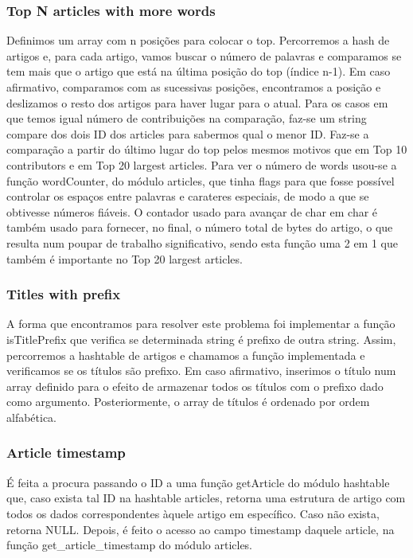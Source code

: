 \documentclass[a4paper]{article}
\begin{document}
\subsubsection{Top N articles with more words}
Definimos um array com n posições para colocar o top. Percorremos a hash de artigos e, para cada artigo, vamos buscar o número de palavras e comparamos se tem mais que o artigo que está na última posição do top (índice n-1). Em caso afirmativo, comparamos com as sucessivas posições, encontramos a posição e deslizamos o resto dos artigos para haver lugar para o atual. Para os casos em que temos igual número de contribuições na comparação, faz-se um string compare dos dois ID dos articles para sabermos qual o menor ID.
Faz-se a comparação a partir do último lugar do top pelos mesmos motivos que em Top 10 contributors e em Top 20 largest articles.
Para ver o número de words usou-se a função wordCounter, do módulo articles, que tinha flags para que fosse possível controlar os espaços entre palavras e carateres especiais, de modo a que se obtivesse números fiáveis. O contador usado para avançar de char em char é também usado para fornecer, no final, o número total de bytes do artigo, o que resulta num poupar de trabalho significativo, sendo esta função uma 2 em 1 que também é importante no Top 20 largest articles.

\subsubsection{Titles with prefix}
A forma que encontramos para resolver este problema foi implementar a função isTitlePrefix que verifica se determinada string é prefixo de outra string. Assim, percorremos a hashtable de artigos e chamamos a função implementada e verificamos se os títulos são prefixo. Em caso afirmativo, inserimos o título num array definido para o efeito de armazenar todos os títulos com o prefixo dado como argumento. Posteriormente, o array de títulos é ordenado por ordem alfabética.

\subsubsection{Article timestamp}
É feita a procura passando o ID a uma função getArticle do módulo hashtable que, caso exista tal ID na hashtable articles, retorna uma estrutura de artigo com todos os dados correspondentes àquele artigo em específico. Caso não exista, retorna NULL. Depois, é feito o acesso ao campo timestamp daquele article, na função get_article_timestamp do módulo articles.
\end{document}
